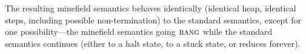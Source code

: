 \documentclass{llncs}
\newcommand{\bang}{\mbox{\sc bang}}
\begin{document}
% 
% 
% 

The resulting minefield semantics behaves identically
(identical heap, identical steps, including possible non-termination)
to the standard semantics, except for one possibility---the
minefield semantics going $\bang$ while the standard semantics
continues (either to a halt state, to a stuck state, or reduces forever).
\end{document}
